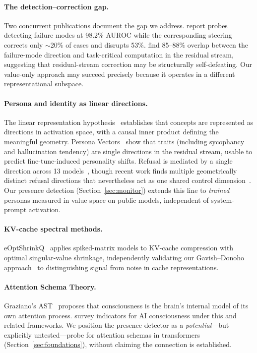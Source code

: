 \documentclass[11pt,a4paper]{article}
\begin{document}
\paragraph{The detection--correction gap.}
Two concurrent publications document the gap we address.
\citet{basu2026interpretability} report probes detecting failure modes at
98.2\% AUROC while the corresponding steering corrects only $\sim$20\% of
cases and disrupts 53\%. \citet{liu2026decodable} find 85--88\% overlap
between the failure-mode direction and task-critical computation in the residual
stream, suggesting that residual-stream correction may be structurally
self-defeating. Our value-only approach may succeed precisely because it
operates in a different representational subspace.

\paragraph{Persona and identity as linear directions.}
The linear representation hypothesis~\citep{park2024linear} establishes that
concepts are represented as directions in activation space, with a causal inner
product defining the meaningful geometry. Persona Vectors~\citep{chen2025persona}
show that traits (including sycophancy and hallucination tendency) are
single directions in the residual stream, usable to predict fine-tune-induced
personality shifts. Refusal is mediated by a single direction across 13
models~\citep{arditi2024refusal}, though recent work finds multiple
geometrically distinct refusal directions that nevertheless act as one shared
control dimension~\citep{joad2026refusal}. Our presence detection
(Section~\ref{sec:monitor}) extends this line to \emph{trained} personas
measured in value space on public models, independent of system-prompt
activation.

\paragraph{KV-cache spectral methods.}
eOptShrinkQ~\citep{eoptq2026} applies spiked-matrix models to KV-cache
compression with optimal singular-value shrinkage, independently validating
our Gavish--Donoho approach~\citep{gavish2014optimal} to distinguishing signal
from noise in cache representations.

\paragraph{Attention Schema Theory.}
Graziano's AST~\citep{graziano2015attention,graziano2017attention} proposes
that consciousness is the brain's internal model of its own attention process.
\citet{butlin2023consciousness} survey indicators for AI consciousness under
this and related frameworks. We position the presence detector as a
\emph{potential}---but explicitly untested---probe for attention schemas in
transformers (Section~\ref{sec:foundations}), without claiming the connection
is established.
\end{document}
